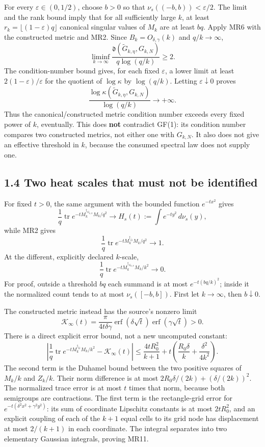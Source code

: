 \documentclass[
  11pt,
]{article}
\begin{document}
For every \(\varepsilon\in(0,1/2)\), choose \(b>0\) so that
\(\nu_s((-b,b))<\varepsilon/2\). The limit and the rank bound imply that
for all sufficiently large \(k\), at least
\(r_k=\lfloor(1-\varepsilon)q\rfloor\) canonical singular values of
\(M_k\) are at least \(bq\). Apply MR6 with the constructed metric and
MR2. Since \(B_k=O_{\delta,\gamma}(k)\) and \(q/k\to\infty\), \[
\boxed{\liminf_{k\to\infty}
\frac{\mathfrak d(\widetilde G_{k,\eta},G_{k,N})}
{q\log(q/k)}\ge2.} \tag{MR7}
\] The condition-number bound gives, for each fixed \(\varepsilon\), a
lower limit at least \(2(1-\varepsilon)/\varepsilon\) for the quotient
of \(\log\kappa\) by \(\log(q/k)\). Letting \(\varepsilon\downarrow0\)
proves \[
\boxed{\frac{\log\kappa(\widetilde G_{k,\eta},G_{k,N})}{\log(q/k)}
\longrightarrow+\infty.} \tag{MR8}
\] Thus the canonical/constructed metric condition number exceeds every
fixed power of \(k\), eventually. This does \textbf{not} contradict
GF(1): its condition number compares two constructed metrics, not either
one with \(G_{k,N}\). It also does not give an effective threshold in
\(k\), because the consumed spectral law does not supply one.

\subsection{1.4 Two heat scales that must not be
identified}\label{two-heat-scales-that-must-not-be-identified}

For fixed \(t>0\), the same argument with the bounded function
\(e^{-t x^2}\) gives \[
\frac1q\operatorname{tr}e^{-tM_k^{\dagger_{G_{k,N}}}M_k/q^2}
\to H_s(t):=\int e^{-ty^2}\,d\nu_s(y),
\] while MR2 gives \[
\frac1q\operatorname{tr}e^{-tM_k^{\dagger_{\widetilde G}}M_k/q^2}\to1.
\tag{MR9}
\] At the different, explicitly declared \(k\)-scale, \[
\boxed{\frac1q\operatorname{tr}e^{-tM_k^{\dagger_{G_{k,N}}}M_k/k^2}\to0.} \tag{MR10}
\] For proof, outside a threshold \(bq\) each summand is at most
\(e^{-t(bq/k)^2}\); inside it the normalized count tends to at most
\(\nu_s([-b,b])\). First let \(k\to\infty\), then \(b\downarrow0\).

The constructed metric instead has the source's nonzero limit \[
\mathcal K_\infty(t)=\frac\pi{4t\delta\gamma}
\operatorname{erf}(\delta\sqrt t)\operatorname{erf}(\gamma\sqrt t)>0.
\tag{MR11}
\] There is a direct explicit error bound, not a new uncomputed
constant: \[
\left|\frac1q\operatorname{tr}e^{-tM_k^{\dagger_{\widetilde G}}M_k/k^2}
-\mathcal K_\infty(t)\right|
\le\frac{4tR_0^2}{k+1}
+t\left(\frac{R_0\delta}{k}+\frac{\delta^2}{4k^2}\right).
\tag{MR12}
\] The second term is the Duhamel bound between the two positive squares
of \(M_k/k\) and \(Z_k/k\). Their norm difference is at most
\(2R_0\delta/(2k)+(\delta/(2k))^2\). The normalized trace error is at
most \(t\) times that norm, because both semigroups are contractions.
The first term is the rectangle-grid error for
\(e^{-t(\delta^2x^2+\gamma^2y^2)}\): its sum of coordinate Lipschitz
constants is at most \(2tR_0^2\), and an explicit coupling of each of
the \(k+1\) equal cells to its grid node has displacement at most
\(2/(k+1)\) in each coordinate. The integral separates into two
elementary Gaussian integrals, proving MR11.
\end{document}
